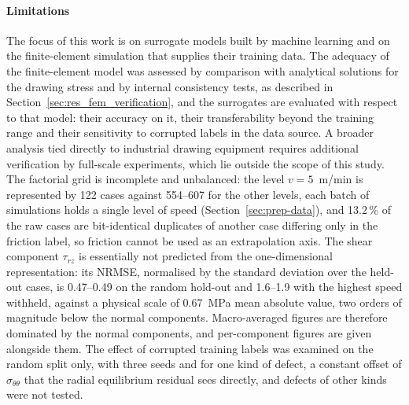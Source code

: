 \paragraph{Limitations}
The focus of this work is on surrogate models built by machine learning and on the finite-element simulation that supplies their training data. The adequacy of the finite-element model was assessed by comparison with analytical solutions for the drawing stress and by internal consistency tests, as described in Section~\ref{sec:res_fem_verification}, and the surrogates are evaluated with respect to that model: their accuracy on it, their transferability beyond the training range and their sensitivity to corrupted labels in the data source. A broader analysis tied directly to industrial drawing equipment requires additional verification by full-scale experiments, which lie outside the scope of this study. %
The factorial grid is incomplete and unbalanced: the level $v = 5$~m/min is represented by 122 cases against 554--607 for the other levels, each batch of simulations holds a single level of speed (Section~\ref{sec:prep-data}), and 13.2\,\% of the raw cases are bit-identical duplicates of another case differing only in the friction label, so friction cannot be used as an extrapolation axis. %
The shear component $\tau_{rz}$ is essentially not predicted from the one-dimensional representation: its NRMSE, normalised by the standard deviation over the held-out cases, is 0.47--0.49 on the random hold-out and 1.6--1.9 with the highest speed withheld, against a physical scale of 0.67~MPa mean absolute value, two orders of magnitude below the normal components. Macro-averaged figures are therefore dominated by the normal components, and per-component figures are given alongside them. %
The effect of corrupted training labels was examined on the random split only, with three seeds and for one kind of defect, a constant offset of $\sigma_{\theta\theta}$ that the radial equilibrium residual sees directly, and defects of other kinds were not tested. %
